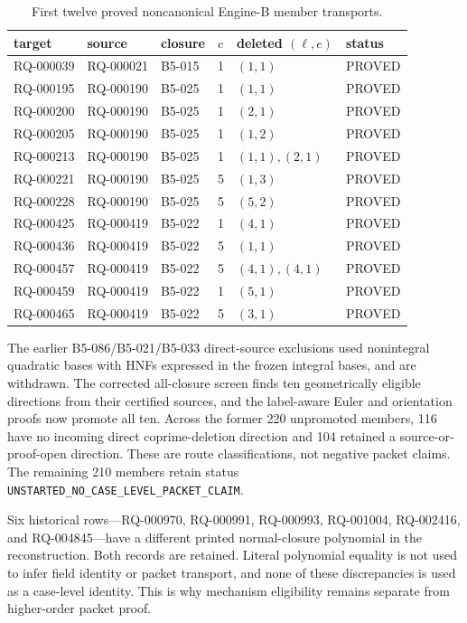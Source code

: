 \documentclass[11pt]{article}
\begin{document}
\begin{table}[ht]
\centering\small
\caption{First twelve proved noncanonical Engine-B member transports.}
\label{tab:transport}
\begin{tabular}{llllll}\toprule
target & source & closure & $c$ & deleted $(\ell,e)$ & status\\\midrule
RQ-000039 & RQ-000021 & B5-015 & 1 & $(1,1)$ & PROVED\\
RQ-000195 & RQ-000190 & B5-025 & 1 & $(1,1)$ & PROVED\\
RQ-000200 & RQ-000190 & B5-025 & 1 & $(2,1)$ & PROVED\\
RQ-000205 & RQ-000190 & B5-025 & 1 & $(1,2)$ & PROVED\\
RQ-000213 & RQ-000190 & B5-025 & 1 & $(1,1),(2,1)$ & PROVED\\
RQ-000221 & RQ-000190 & B5-025 & 5 & $(1,3)$ & PROVED\\
RQ-000228 & RQ-000190 & B5-025 & 5 & $(5,2)$ & PROVED\\
RQ-000425 & RQ-000419 & B5-022 & 1 & $(4,1)$ & PROVED\\
RQ-000436 & RQ-000419 & B5-022 & 5 & $(1,1)$ & PROVED\\
RQ-000457 & RQ-000419 & B5-022 & 5 & $(4,1),(4,1)$ & PROVED\\
RQ-000459 & RQ-000419 & B5-022 & 1 & $(5,1)$ & PROVED\\
RQ-000465 & RQ-000419 & B5-022 & 5 & $(3,1)$ & PROVED\\\bottomrule
\end{tabular}
\end{table}

The earlier B5-086/B5-021/B5-033 direct-source exclusions used
nonintegral quadratic bases with HNFs expressed in the frozen integral
bases, and are withdrawn.  The corrected all-closure screen finds ten
geometrically eligible directions from their certified sources, and
the label-aware Euler and orientation proofs now promote all ten.
Across the former 220 unpromoted members, 116 have no incoming direct
coprime-deletion direction and 104 retained a
source-or-proof-open direction.  These are route classifications, not
negative packet claims.  The remaining 210 members retain status
\texttt{UNSTARTED\_NO\_CASE\_LEVEL\_PACKET\_CLAIM}.

Six historical rows---RQ-000970, RQ-000991, RQ-000993, RQ-001004,
RQ-002416, and RQ-004845---have a different printed normal-closure
polynomial in the reconstruction.  Both records are retained.  Literal
polynomial equality is not used to infer field identity or packet
transport, and none of these discrepancies is used as a case-level
identity.  This is why mechanism eligibility remains separate from
higher-order packet proof.
\end{document}
